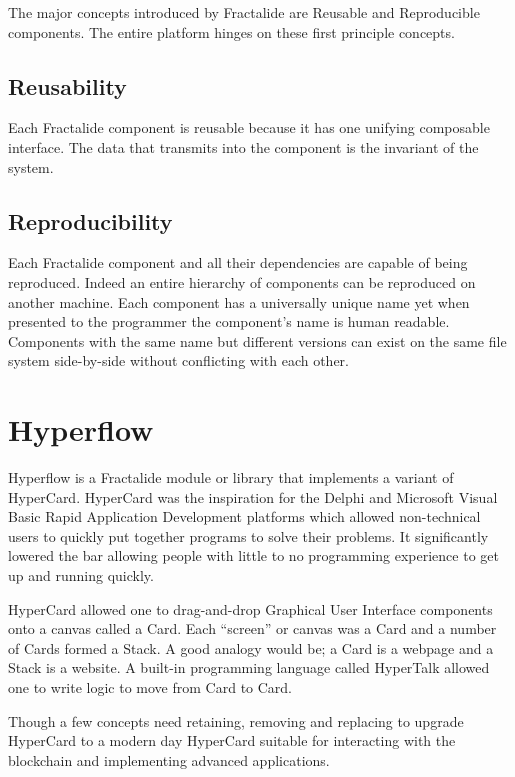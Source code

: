 \documentclass[%
 aip,
 jmp,%
 amsmath,amssymb,
 preprint,
 reprint,
 author-year,
 author-numerical,
]{revtex4-1}
\begin{document}
The major concepts introduced by Fractalide are Reusable and Reproducible components. The entire platform hinges on these first principle concepts.

\subsection{\label{sec:reusability}Reusability}

Each Fractalide component is reusable because it has one unifying composable interface. The data that transmits into the component is the invariant of the system.

\subsection{\label{sec:reproducibility}Reproducibility}

Each Fractalide component and all their dependencies are capable of being reproduced. Indeed an entire hierarchy of components can be reproduced on another machine. Each component has a universally unique name yet when presented to the programmer the component's name is human readable. Components with the same name but different versions can exist on the same file system side-by-side without conflicting with each other.

\section{\label{sec:hyperflow}Hyperflow}

Hyperflow is a Fractalide module or library that implements a variant of HyperCard. HyperCard was the inspiration for the Delphi and Microsoft Visual Basic Rapid Application Development platforms which allowed non-technical users to quickly put together programs to solve their problems. It significantly lowered the bar allowing people with little to no programming experience to get up and running quickly.

HyperCard allowed one to drag-and-drop Graphical User Interface components onto a canvas called a Card. Each ``screen'' or canvas was a Card and a number of Cards formed a Stack. A good analogy would be; a Card is a webpage and a Stack is a website. A built-in programming language called HyperTalk allowed one to write logic to move from Card to Card.

Though a few concepts need retaining, removing and replacing to upgrade HyperCard to a modern day HyperCard suitable for interacting with the blockchain and implementing advanced applications.
\end{document}
